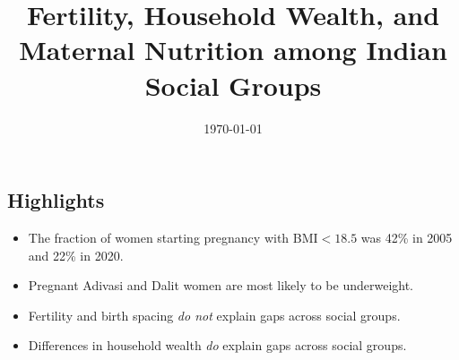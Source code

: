 \documentclass[12pt]{article}
\begin{document}
\RaggedRight
 
\title{Fertility, Household Wealth, and Maternal Nutrition among Indian Social Groups} 
\date{\today} 
\maketitle
   


\subsection*{Highlights}
{
\begin{itemize}
    \item The fraction of women starting pregnancy with BMI$<18.5$ was 42\% in 2005 and 22\% in 2020.
    \item Pregnant Adivasi and Dalit women are most likely to be underweight.
    \item Fertility and birth spacing \emph{do not} explain gaps across social groups.
    \item Differences in household wealth \emph{do} explain gaps across social groups.
\end{itemize}
}
\newpage
\doublespacing
\end{document}
